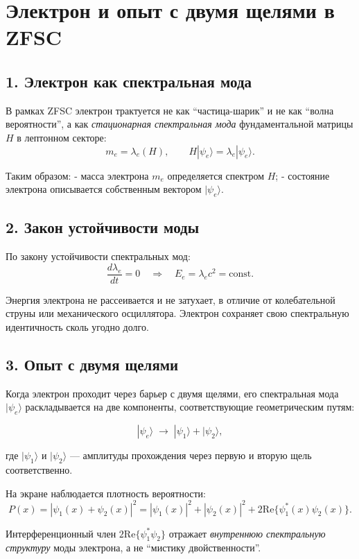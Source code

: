 \documentclass[12pt,a4paper]{article}
\begin{document}
\section*{Электрон и опыт с двумя щелями в ZFSC}

\subsection*{1. Электрон как спектральная мода}
В рамках ZFSC электрон трактуется не как ``частица-шарик'' и не как 
``волна вероятности'', а как \emph{стационарная спектральная мода} 
фундаментальной матрицы $H$ в лептонном секторе:
\[
m_e = \lambda_e(H), \qquad 
H |\psi_e\rangle = \lambda_e |\psi_e\rangle .
\]

Таким образом:
- масса электрона $m_e$ определяется спектром $H$;
- состояние электрона описывается собственным вектором $|\psi_e\rangle$.

\subsection*{2. Закон устойчивости моды}
По закону устойчивости спектральных мод:
\[
\frac{d\lambda_e}{dt} = 0 \quad \Rightarrow \quad 
E_e = \lambda_e c^2 = \text{const}.
\]

Энергия электрона не рассеивается и не затухает, в отличие от колебательной струны или механического осциллятора.  
Электрон сохраняет свою спектральную идентичность сколь угодно долго.

\subsection*{3. Опыт с двумя щелями}
Когда электрон проходит через барьер с двумя щелями, его спектральная мода $|\psi_e\rangle$ раскладывается на две компоненты, соответствующие геометрическим путям:

\[
|\psi_e\rangle \;\to\; |\psi_1\rangle + |\psi_2\rangle ,
\]

где $|\psi_1\rangle$ и $|\psi_2\rangle$ --- амплитуды прохождения через первую и вторую щель соответственно.  

На экране наблюдается плотность вероятности:
\[
P(x) = |\psi_1(x) + \psi_2(x)|^2 
= |\psi_1(x)|^2 + |\psi_2(x)|^2 + 2\mathrm{Re}\{\psi_1^*(x)\psi_2(x)\}.
\]

Интерференционный член $2\mathrm{Re}\{\psi_1^*\psi_2\}$ отражает \emph{внутреннюю спектральную структуру} моды электрона, а не ``мистику двойственности''.
\end{document}
